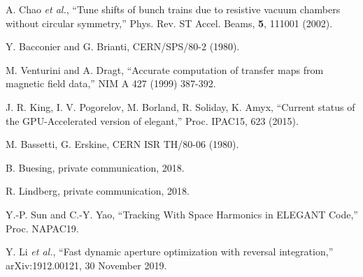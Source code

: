 \documentclass[11pt]{article}
\begin{document}
\begin{thebibliography}{99}
  A. Chao {\em et al.}, ``Tune shifts of bunch trains due to resistive vacuum chambers without circular symmetry,''
  Phys. Rev. ST Accel. Beams, {\bf 5}, 111001 (2002).

Y. Bacconier and G. Brianti, CERN/SPS/80-2 (1980).

M. Venturini and A. Dragt, ``Accurate computation of transfer maps from magnetic field data,'' 
NIM A 427 (1999) 387-392.

J. R. King, I. V. Pogorelov, M. Borland, R. Soliday, K. Amyx,
``Current status of the GPU-Accelerated version of elegant,''
Proc. IPAC15, 623 (2015).

M. Bassetti, G. Erskine, CERN ISR TH/80-06 (1980).

B. Buesing, private communication, 2018.

R. Lindberg, private communication, 2018.

Y.-P. Sun and C.-Y. Yao, ``Tracking With Space Harmonics in ELEGANT Code,'' Proc. NAPAC19.

  Y. Li {\em et al.}, ``Fast dynamic aperture optimization with reversal integration,''
  arXiv:1912.00121, 30 November 2019.

\end{thebibliography}
\end{document}
